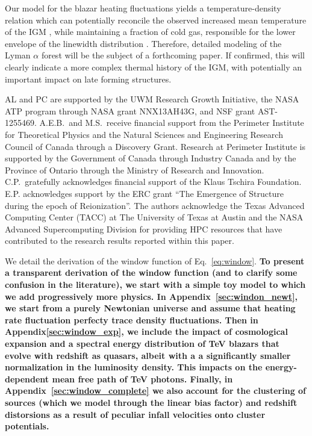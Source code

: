 \documentclass[numberedappendix]{emulateapj}
\newcommand\Cc[1]{{\color{blue} \bf #1}} %
\begin{document}
{Our model for the blazar heating fluctuations yields a temperature-density relation which can potentially reconcile the observed increased mean temperature of the IGM \citep{2014MNRAS.441.1916B}, while maintaining a fraction of cold gas, responsible for the lower envelope of the linewidth distribution \citep{2012ApJ...757L..30R}. Therefore, detailed modeling of the Lyman $\alpha$ forest will be the subject of a forthcoming paper. If confirmed, this will clearly indicate a more complex thermal history of the IGM, with potentially an important impact on late forming structures.
\begin{acknowledgements}
AL and PC are supported by the UWM Research Growth Initiative, the NASA ATP
program through NASA grant NNX13AH43G, and NSF grant AST-1255469.
A.E.B.~and M.S.~receive financial support from the Perimeter
Institute for Theoretical Physics and the Natural Sciences and
Engineering Research Council of Canada through a Discovery Grant.
Research at Perimeter Institute is supported by the Government of
Canada through Industry Canada and by the Province of Ontario through
the Ministry of Research and Innovation.
C.P.~gratefully acknowledges
financial support of the Klaus Tschira Foundation. E.P. acknowledges support by the ERC grant ``The Emergence of Structure during the epoch of Reionization''.
The authors acknowledge the Texas Advanced Computing Center (TACC) at The University of Texas at Austin and the NASA Advanced Supercomputing Division for providing HPC resources that have contributed to the research results reported within this paper.
\end{acknowledgements}

\appendix
We detail the derivation of the window function of Eq.~\eqref{eq:window}. \Cc{To present a transparent derivation of the window function (and to clarify some confusion in the literature), we start with a simple toy model to which we add progressively more physics. In Appendix~\ref{sec:windon_newt}, we start from a purely Newtonian universe and assume that heating rate fluctuation perfecty trace density fluctuations. Then in Appendix\ref{sec:window_exp}, we include the impact of cosmological expansion and a spectral energy distribution of TeV blazars that evolve with redshift as quasars, albeit with a a significantly smaller normalization in the luminosity density. This impacts on the energy-dependent mean free path of TeV photons. Finally, in Appendix~\ref{sec:window_complete} we also account for the clustering of sources (which we model through the linear bias factor) and redshift distorsions as a result of peculiar infall velocities onto cluster potentials.}\\

}
\end{document}
